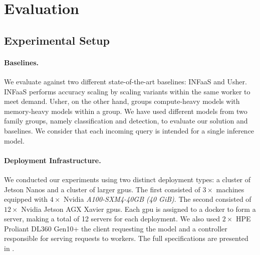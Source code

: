 \section{Evaluation}

\subsection{Experimental Setup}
\label{sec:setup}


\paragraph{Baselines.} We evaluate \roomie{} against two different state-of-the-art baselines: INFaaS and Usher. INFaaS performs accuracy scaling by scaling variants within the same worker to meet demand. Usher, on the other hand, groups compute-heavy models with memory-heavy models within a group. We have used different models from two family groups, namely classification and detection, to evaluate our solution and baselines. We consider that each incoming query is intended for a single inference model.

\paragraph{Deployment Infrastructure.} We conducted our experiments using two distinct deployment types: a cluster of Jetson Nanos and a cluster of larger \acrshort{gpu}s. The first consisted of $3\times$ machines equipped with $4\times$ Nvidia \textit{A100-SXM4-40GB (40 GiB)}. The second consisted of $12\times$ Nvidia Jetson AGX Xavier \acrshort{gpu}s. Each \acrshort{gpu} is assigned to a docker to form a server, making a total of 12 servers for each deployment. We also used $2\times$ HPE Proliant DL360 Gen10+ the client requesting the model and a controller responsible for serving requests to workers. The full specifications are presented in .

